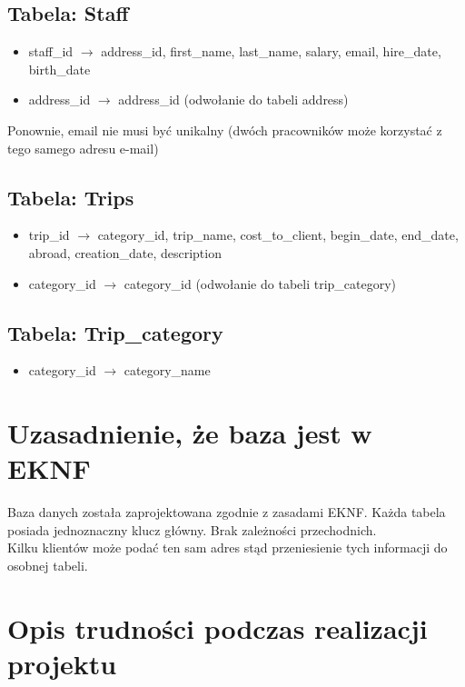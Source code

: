 \documentclass{article}
\begin{document}
\subsection{Tabela: Staff}
\begin{itemize}
    \item staff\_id $\rightarrow$ address\_id, first\_name, last\_name, salary, email, hire\_date, birth\_date
    \item address\_id $\rightarrow$ address\_id (odwołanie do tabeli address)
\end{itemize}
Ponownie, email nie musi być unikalny (dwóch pracowników może korzystać z tego samego adresu e-mail)
\subsection{Tabela: Trips}
\begin{itemize}
    \item trip\_id $\rightarrow$ category\_id, trip\_name, cost\_to\_client, begin\_date, end\_date, abroad, creation\_date, description
    \item category\_id $\rightarrow$ category\_id (odwołanie do tabeli trip\_category)
\end{itemize}
\subsection{Tabela: Trip\_category}
\begin{itemize}
    \item category\_id $\rightarrow$ category\_name
\end{itemize}

\newpage

\section{Uzasadnienie, że baza jest w EKNF}
Baza danych została zaprojektowana zgodnie z zasadami EKNF. Każda tabela posiada jednoznaczny klucz główny. Brak zależności przechodnich. \\Kilku klientów może podać ten sam adres stąd przeniesienie tych informacji do osobnej tabeli.

\section{Opis trudności podczas realizacji projektu}
\end{document}
